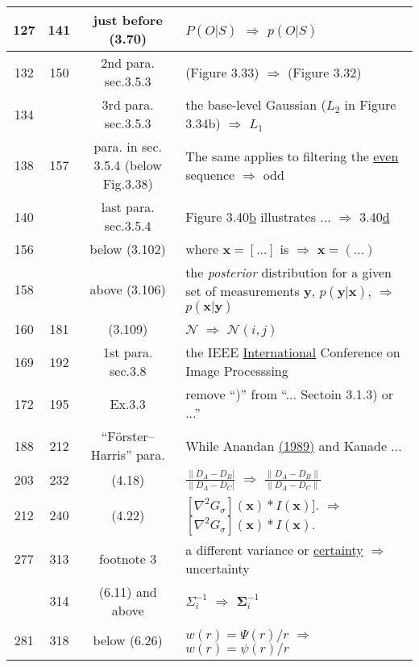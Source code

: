 \documentclass[10pt]{article}
\begin{document}
\begin{tabular}{|c|c|c|l|}
127 & 141 & just before (3.70) & $P(O|S)$ $\Rightarrow$ $p(O|S)$ \\\hline
132 & 150 & 2nd para. sec.3.5.3 & (Figure 3.33) $\Rightarrow$ (Figure 3.32)  \\\hline
134 &        & 3rd para. sec.3.5.3 & the base-level Gaussian (\underline{$L_2$} in Figure 3.34b) $\Rightarrow$ $L_1$ \\\hline
138 & 157 &  para. in sec. 3.5.4 (below Fig.3.38) &  The same applies to filtering the \underline{even} sequence    $\Rightarrow$  odd \\\hline
140 &       & last para. sec.3.5.4 & Figure 3.40\underline{b} illustrates ... $\Rightarrow$ 3.40\underline{d} \\\hline
156 &      & below (3.102) & where $\boldsymbol{x} = [ ... ] $ is $\Rightarrow$ $\boldsymbol{x} = ( ... ) $ \\\hline
158 &       & above (3.106) & the \textit{posterior} distribution for a given set of measurements $\boldsymbol{y}$, \underline{$p(\boldsymbol{y}|\boldsymbol{x})$}, $\Rightarrow$ $p(\boldsymbol{x}|\boldsymbol{y})$ \\\hline
160 & 181 & (3.109) & $\mathcal{N}$  $\Rightarrow$  $\mathcal{N}(i,j)$ \\\hline
169 & 192 & 1st para. sec.3.8 &  the IEEE \underline{International} Conference on Image Processsing \\\hline
172 & 195 & Ex.3.3 & remove ``)'' from ``... Sectoin 3.1.3) or ...'' \\\hline
188 & 212 & ``F\"{o}rster--Harris'' para. & While Anandan \underline{(1989)} and Kanade ... \\\hline
203 & 232 & (4.18) & $\frac{\| D_A - D_B|}{\| D_A - D_C |}$ $\Rightarrow$  $\frac{\| D_A - D_B \|}{\| D_A - D_C \|}$  \\\hline
212 & 240 & (4.22) & $[ \nabla ^2 G_\sigma ] (\boldsymbol{x} ) * I(\boldsymbol{x})].$ $\Rightarrow$ $[ \nabla ^2 G_\sigma ] (\boldsymbol{x} ) * I(\boldsymbol{x}).$ \\\hline
277 & 313 & footnote 3 & a different variance or \underline{certainty} $\Rightarrow$ uncertainty \\\hline
    & 314 & (6.11) and above & $\Sigma_i^{-1}$ $\Rightarrow$ $\boldsymbol{\Sigma}_i^{-1}$ \\\hline
281 & 318 & below (6.26) & $w(r)=\Psi (r) / r$ $\Rightarrow$ $w(r)=\psi (r) / r$ \\\hline

\end{tabular}
\end{document}
